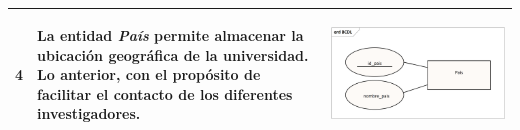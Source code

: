 \begin{table}[htb!]
\begin{threeparttable}
\begin{tabular}{p{0.5cm} p{7cm} p{7cm}}
			\\ \hline
			4
			& La entidad \textit{País} permite almacenar la ubicación geográfica de la universidad. Lo anterior, con el propósito de facilitar el contacto de los diferentes investigadores.
			& \begin{center}\includegraphics[width=1\linewidth]{MER/IMAGENES_MER/4_PAIS}\end{center}
			\\ \hline
		\end{tabular}
	\end{threeparttable}
\end{table}

